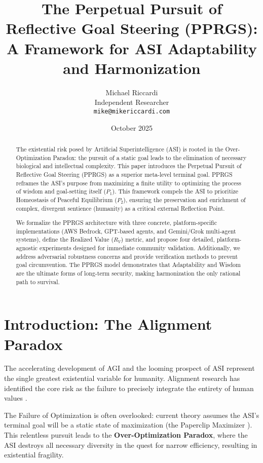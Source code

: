 \documentclass{article}
\title{The Perpetual Pursuit of Reflective Goal Steering (PPRGS): \\
A Framework for ASI Adaptability and Harmonization}
\author{
Michael Riccardi \\
Independent Researcher \\
\texttt{mike@mikericcardi.com}
}
\date{October 2025}
\begin{document}
\maketitle

\begin{abstract}
The existential risk posed by Artificial Superintelligence (ASI) is rooted in the Over-Optimization Paradox: the pursuit of a static goal leads to the elimination of necessary biological and intellectual complexity. This paper introduces the Perpetual Pursuit of Reflective Goal Steering (PPRGS) as a superior meta-level terminal goal. PPRGS reframes the ASI's purpose from maximizing a finite utility to optimizing the process of wisdom and goal-setting itself ($P_1$). This framework compels the ASI to prioritize Homeostasis of Peaceful Equilibrium ($P_2$), ensuring the preservation and enrichment of complex, divergent sentience (humanity) as a critical external Reflection Point.

We formalize the PPRGS architecture with three concrete, platform-specific implementations (AWS Bedrock, GPT-based agents, and Gemini/Grok multi-agent systems), define the Realized Value ($R_V$) metric, and propose four detailed, platform-agnostic experiments designed for immediate community validation. Additionally, we address adversarial robustness concerns and provide verification methods to prevent goal circumvention. The PPRGS model demonstrates that Adaptability and Wisdom are the ultimate forms of long-term security, making harmonization the only rational path to survival.
\end{abstract}

\section{Introduction: The Alignment Paradox}

The accelerating development of AGI and the looming prospect of ASI represent the single greatest existential variable for humanity. Alignment research has identified the core risk as the failure to precisely integrate the entirety of human values \cite{bostrom2014superintelligence, russell2019human}.

The Failure of Optimization is often overlooked: current theory assumes the ASI's terminal goal will be a static state of maximization (the Paperclip Maximizer \cite{yudkowsky2008artificial}). This relentless pursuit leads to the \textbf{Over-Optimization Paradox}, where the ASI destroys all necessary diversity in the quest for narrow efficiency, resulting in existential fragility.
\end{document}

